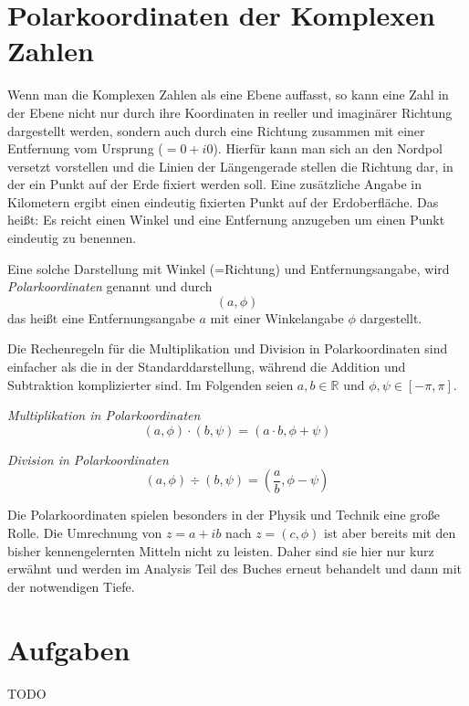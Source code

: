 \section{Polarkoordinaten der Komplexen Zahlen}

Wenn man die Komplexen Zahlen als eine Ebene auffasst, so kann eine Zahl in der Ebene nicht nur durch ihre Koordinaten in reeller und imaginärer Richtung dargestellt werden, sondern auch durch eine Richtung zusammen mit einer Entfernung vom Ursprung ($=0+i0$). Hierfür kann man sich an den Nordpol versetzt vorstellen und die Linien der Längengerade stellen die Richtung dar, in der ein Punkt auf der Erde fixiert werden soll. Eine zusätzliche Angabe in Kilometern ergibt einen eindeutig fixierten Punkt auf der Erdoberfläche. Das heißt: Es reicht einen Winkel und eine Entfernung anzugeben um einen Punkt eindeutig zu benennen. 

\begin{definition}
Eine solche Darstellung mit Winkel (=Richtung) und Entfernungsangabe, wird \textsl{Polarkoordinaten} genannt und durch 
\[(a,\phi)\]
das heißt eine Entfernungsangabe $a$ mit einer Winkelangabe $\phi$ dargestellt.
\end{definition}

Die Rechenregeln für die Multiplikation und Division in Polarkoordinaten sind einfacher als die in der Standarddarstellung, während die Addition und Subtraktion komplizierter sind. Im Folgenden seien $a,b \in \mathbb{R}$ und $\phi,\psi \in \left[-\pi, \pi\right]$.

\begin{definition} \textsl{Multiplikation in Polarkoordinaten}
\[
(a,\phi) \cdot (b,\psi) = (a\cdot b, \phi+\psi)
\]
\end{definition}

\begin{definition} \textsl{Division in Polarkoordinaten}
\[
(a,\phi) \div (b,\psi) = \left(\frac{a}{b}, \phi-\psi\right)
\]
\end{definition}

Die Polarkoordinaten spielen besonders in der Physik und Technik eine große Rolle. Die Umrechnung von $z=a+ib$ nach $z=(c,\phi)$ ist aber bereits mit den bisher kennengelernten Mitteln nicht zu leisten. Daher sind sie hier nur kurz erwähnt und werden im Analysis Teil des Buches erneut behandelt und dann mit der notwendigen Tiefe. 


\section{Aufgaben}
TODO

